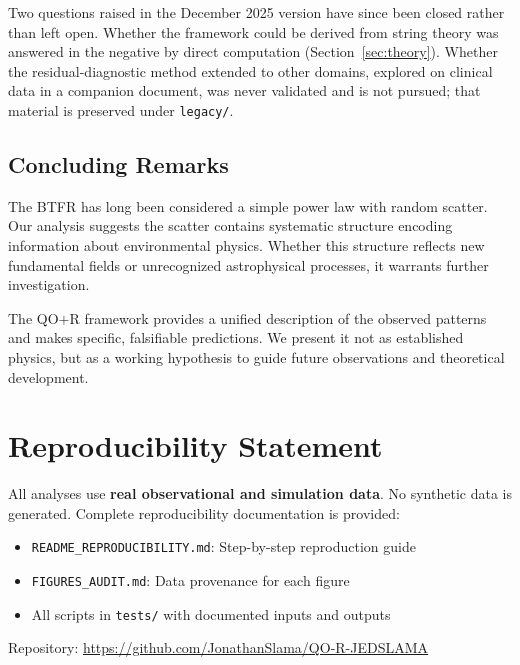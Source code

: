 \documentclass[12pt,a4paper]{article}
\newcommand{\QOR}{QO$+$R}
\begin{document}
Two questions raised in the December 2025 version have since been closed rather than left open. Whether the framework could be derived from string theory was answered in the negative by direct computation (Section~\ref{sec:theory}). Whether the residual-diagnostic method extended to other domains, explored on clinical data in a companion document, was never validated and is not pursued; that material is preserved under \texttt{legacy/}.

\subsection{Concluding Remarks}

The BTFR has long been considered a simple power law with random scatter. Our analysis suggests the scatter contains systematic structure encoding information about environmental physics. Whether this structure reflects new fundamental fields or unrecognized astrophysical processes, it warrants further investigation.

The \QOR{} framework provides a unified description of the observed patterns and makes specific, falsifiable predictions. We present it not as established physics, but as a working hypothesis to guide future observations and theoretical development.

\section*{Reproducibility Statement}

All analyses use \textbf{real observational and simulation data}. No synthetic data is generated. Complete reproducibility documentation is provided:

\begin{itemize}
    \item \texttt{README\_REPRODUCIBILITY.md}: Step-by-step reproduction guide
    \item \texttt{FIGURES\_AUDIT.md}: Data provenance for each figure
    \item All scripts in \texttt{tests/} with documented inputs and outputs
\end{itemize}

Repository: \url{https://github.com/JonathanSlama/QO-R-JEDSLAMA}

\end{document}
